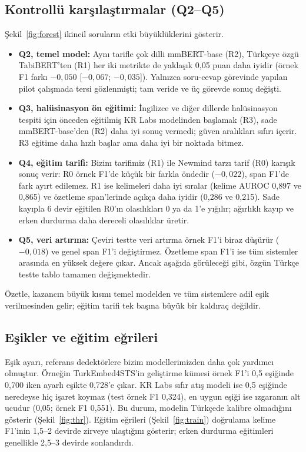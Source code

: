 \documentclass[conference,a4paper]{IEEEtran}
\begin{document}
\subsection{Kontrollü karşılaştırmalar (Q2--Q5)}
Şekil~\ref{fig:forest} ikincil soruların etki büyüklüklerini gösterir.
\begin{itemize}
\item \textbf{Q2, temel model:} Aynı tarifle çok dilli mmBERT-base (R2), Türkçeye özgü TabiBERT'ten (R1) her iki metrikte de yaklaşık 0{,}05 puan daha iyidir (örnek F1 farkı $-0{,}050$ [$-0{,}067$; $-0{,}035$]). Yalnızca soru-cevap görevinde yapılan pilot çalışmada tersi gözlenmişti; tam veride ve üç görevde sonuç değişti.
\item \textbf{Q3, halüsinasyon ön eğitimi:} İngilizce ve diğer dillerde halüsinasyon tespiti için önceden eğitilmiş KR Labs modelinden başlamak (R3), sade mmBERT-base'den (R2) daha iyi sonuç vermedi; güven aralıkları sıfırı içerir. R3 eğitime daha hızlı başlar ama daha iyi bir noktada bitmez.
\item \textbf{Q4, eğitim tarifi:} Bizim tarifimiz (R1) ile Newmind tarzı tarif (R0) karışık sonuç verir: R0 örnek F1'de küçük bir farkla öndedir ($-0{,}022$), span F1'de fark ayırt edilemez. R1 ise kelimeleri daha iyi sıralar (kelime AUROC 0{,}897 ve 0{,}865) ve özetleme span'lerinde açıkça daha iyidir (0{,}286 ve 0{,}215). Sade kayıpla 6 devir eğitilen R0'ın olasılıkları 0 ya da 1'e yığılır; ağırlıklı kayıp ve erken durdurma daha dereceli olasılıklar üretir.
\item \textbf{Q5, veri artırma:} Çeviri testte veri artırma örnek F1'i biraz düşürür ($-0{,}018$) ve genel span F1'i değiştirmez. Özetleme span F1'i ise tüm sistemler arasında en yüksek değere çıkar. Ancak aşağıda görüleceği gibi, özgün Türkçe testte tablo tamamen değişmektedir.
\end{itemize}
Özetle, kazancın büyük kısmı temel modelden ve tüm sistemlere adil eşik verilmesinden gelir; eğitim tarifi tek başına büyük bir kaldıraç değildir.

\subsection{Eşikler ve eğitim eğrileri}
Eşik ayarı, referans dedektörlere bizim modellerimizden daha çok yardımcı olmuştur. Örneğin TurkEmbed4STS'in geliştirme kümesi örnek F1'i 0{,}5 eşiğinde 0{,}700 iken ayarlı eşikte 0{,}728'e çıkar. KR Labs sıfır atış modeli ise 0{,}5 eşiğinde neredeyse hiç işaret koymaz (test örnek F1 0{,}324), en uygun eşiği ise ızgaranın alt ucudur (0{,}05; örnek F1 0{,}551). Bu durum, modelin Türkçede kalibre olmadığını gösterir (Şekil~\ref{fig:thr}). Eğitim eğrileri (Şekil~\ref{fig:train}) doğrulama kelime F1'inin 1{,}5--2 devirde zirveye ulaştığını gösterir; erken durdurma eğitimleri genellikle 2{,}5--3 devirde sonlandırdı.
\end{document}
